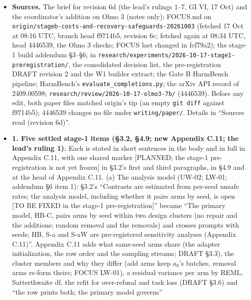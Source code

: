 \documentclass{article}
\theoremstyle{plain}
\theoremstyle{definition}
\theoremstyle{remark}
\begin{document}
\begin{itemize}
  \item \textbf{Sources.} The brief for revision 6d (the lead's rulings 1--7, GI
        VI, 17 Oct) and the coordinator's addition on Olmo 3 (notes only);
        FOCUS.md on
        \nolinkurl{origin/stageb-costs-and-recovery-safeguards-20261003}
        (fetched 17 Oct at 08:16 UTC, branch head f9714b5, revision 6c; fetched
        again at 08:34 UTC, head 4446539, the Olmo 3 checks; FOCUS last changed
        in fcf79a2); the stage-1 build addendum \S{}3--\S{}6; in
        \nolinkurl{research/experiments/2026-10-17-stage1-preregistration/}, the
        consolidated decision list, the pre-registration DRAFT revision 2 and
        the W1 builder extract; the Gate B HarmBench pipeline; HarmBench's
        \nolinkurl{evaluate_completions.py}; the arXiv API record of 2409.00598;
        \nolinkurl{research/review/2026-10-17-olmo3-7b/} (4446539). Before any
        edit, both paper files matched origin's tip (an empty \texttt{git diff}
        against f9714b5); 4446539 changes no file under
        \nolinkurl{writing/paper/}. Details in ``Sources read (revision 6d)''.
  \item \textbf{1. Five settled stage-1 items (\S{}3.2, \S{}4.9; new Appendix
        C.11; the lead's ruling 1).} Each is stated in short sentences in the
        body and in full in Appendix C.11, with one shared marker [PLANNED; the
        stage-1 pre-registration is not yet frozen] in \S{}3.2's first and third
        paragraphs, in \S{}4.9 and at the head of Appendix C.11. (a) The
        analysis model (UW-02; LW-01; addendum \S{}6 item 1): \S{}3.2's
        ``Contrasts are estimated from per-seed unsafe rates; the analysis
        model, including whether it pairs arms by seed, is open [TO BE FIXED in
        the stage-1 pre-registration]'' became ``The primary model, HB-C, pairs
        arms by seed within two design clusters (no repair and the additions;
        random removal and the removals) and crosses prompts with seeds; HB, S-a
        and S-aW are pre-registered sensitivity analyses (Appendix C.11)''.
        Appendix C.11 adds what same-seed arms share (the adapter
        initialization, the row order and the sampling streams; DRAFT \S{}3.3),
        the cluster members and why they differ (add arms keep $a_0$'s batches,
        removal arms re-form theirs; FOCUS LW-01), a residual variance per arm
        by REML, Satterthwaite df, the refit for over-refusal and task loss
        (DRAFT \S{}3.6) and ``the row prints both; the primary model governs''

\end{itemize}
\end{document}
